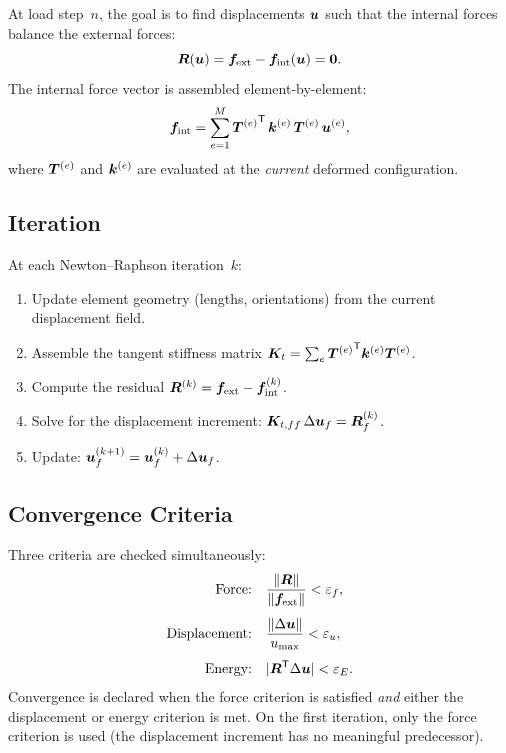 At load step~$n$, the goal is to find displacements $\bm{u}$ such that
the internal forces balance the external forces:
%
\begin{equation}
    \bm{R}(\bm{u}) = \bm{f}_{\text{ext}} - \bm{f}_{\text{int}}(\bm{u}) = \bm{0}.
\end{equation}
%
The internal force vector is assembled element-by-element:
%
\begin{equation}
    \bm{f}_{\text{int}} = \sum_{e=1}^{M}
    {\bm{T}^{(e)}}^{\mathsf{T}}\, \bm{k}^{(e)}\, \bm{T}^{(e)}\, \bm{u}^{(e)},
\end{equation}
%
where $\bm{T}^{(e)}$ and $\bm{k}^{(e)}$ are evaluated at the
\emph{current} deformed configuration.

\subsection{Iteration}

At each Newton--Raphson iteration~$k$:
%
\begin{enumerate}[nosep]
    \item Update element geometry (lengths, orientations) from the current
          displacement field.
    \item Assemble the tangent stiffness matrix
          $\bm{K}_t = \sum_e {\bm{T}^{(e)}}^{\mathsf{T}} \bm{k}^{(e)} \bm{T}^{(e)}$.
    \item Compute the residual $\bm{R}^{(k)} = \bm{f}_{\text{ext}} - \bm{f}_{\text{int}}^{(k)}$.
    \item Solve for the displacement increment:
          $\bm{K}_{t,ff}\, \Delta\bm{u}_f = \bm{R}_f^{(k)}$.
    \item Update: $\bm{u}_f^{(k+1)} = \bm{u}_f^{(k)} + \Delta\bm{u}_f$.
\end{enumerate}

\subsection{Convergence Criteria}

Three criteria are checked simultaneously:
%
\begin{align}
    \text{Force:} \quad & \frac{\|\bm{R}\|}{\|\bm{f}_{\text{ext}}\|} < \varepsilon_f, \\[4pt]
    \text{Displacement:} \quad & \frac{\|\Delta\bm{u}\|}{u_{\max}} < \varepsilon_u, \\[4pt]
    \text{Energy:} \quad & |\bm{R}^{\mathsf{T}} \Delta\bm{u}| < \varepsilon_E.
\end{align}
%
Convergence is declared when the force criterion is satisfied \emph{and}
either the displacement or energy criterion is met.  On the first iteration,
only the force criterion is used (the displacement increment has no
meaningful predecessor).

